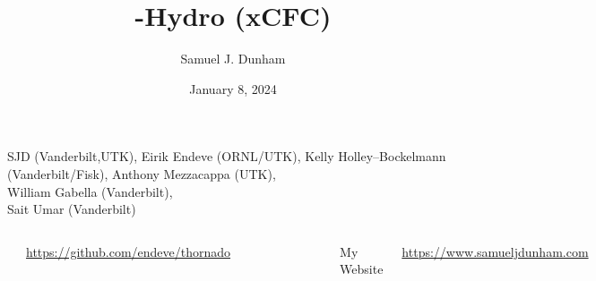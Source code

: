 \documentclass{beamer}
\title[AAS 243]{\thornado-Hydro (xCFC)}
\author{Samuel J. Dunham}
\date{January 8, 2024}
\begin{document}
\begin{frame}

  \maketitle

  \vspace{-1em}

  \begin{center}
    SJD (Vanderbilt,UTK), %
    Eirik Endeve (ORNL/UTK), %
    Kelly Holley--Bockelmann (Vanderbilt/Fisk), %
    Anthony Mezzacappa (UTK), \\
    William Gabella (Vanderbilt), \\
    Sait Umar (Vanderbilt)
  \end{center}

  \vspace{-1em}

  \begin{columns}[c]

      \begin{center}\thornado\end{center}
      \vspace{-2.0em}
      \begin{center}{\tiny \url{https://github.com/endeve/thornado}}\end{center}
      \vspace{-1.5em}
      \begin{figure}[htb!]
       \centering
       \includegraphics[width=0.2\textwidth]{fig.thornado.png}
      \end{figure}

      \begin{center}My Website\end{center}
      \vspace{-2.0em}
      \begin{center}{\tiny \url{https://www.samueljdunham.com}}\end{center}
      \vspace{-1.5em}
      \begin{figure}[htb!]
       \centering
       \includegraphics[width=0.2\textwidth]{fig.website.png}
      \end{figure}

  \end{columns}

\end{frame}
\end{document}
